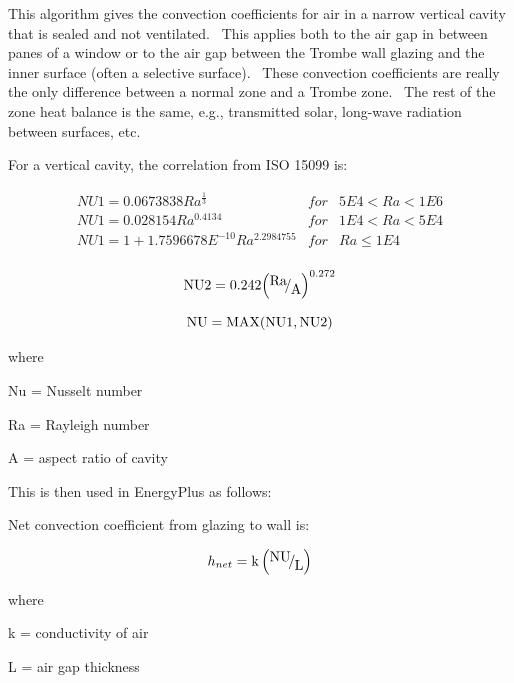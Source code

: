This algorithm gives the convection coefficients for air in a narrow vertical cavity that is sealed and not ventilated.~ This applies both to the air gap in between panes of a window or to the air gap between the Trombe wall glazing and the inner surface (often a selective surface).~ These convection coefficients are really the only difference between a normal zone and a Trombe zone.~ The rest of the zone heat balance is the same, e.g., transmitted solar, long-wave radiation between surfaces, etc.

For a vertical cavity, the correlation from ISO 15099 is:

\begin{equation}
\begin{array}{lcl}
    NU1 = 0.0673838 Ra^{\frac{1}{3}} & for &  5E4 < Ra < 1E6 \\
    NU1 = 0.028154 Ra^{0.4134} & for &  1E4 < Ra < 5E4 \\
    NU1 = 1 + 1.7596678E^{-10} Ra^{2.2984755} & for &  Ra \leq 1E4 \\
\end{array}
\end{equation}

\begin{equation}
{\rm{NU2}} = 0.242{\left( {{\raise0.7ex\hbox{{{\rm{Ra}}}} \!\mathord{\left/ {\vphantom {{{\rm{Ra}}} {\rm{A}}}}\right.}\!\lower0.7ex\hbox{{\rm{A}}}}} \right)^{0.272}}
\end{equation}

\begin{equation}
{\rm{NU = MAX(NU1,NU2)}}
\end{equation}

where

Nu = Nusselt number

Ra = Rayleigh number

A = aspect ratio of cavity

This is then used in EnergyPlus as follows:

Net convection coefficient from glazing to wall is:

\begin{equation}
{h_{net}} = {\rm{k}}\left( {{\raise0.7ex\hbox{{{\rm{NU}}}} \!\mathord{\left/ {\vphantom {{{\rm{NU}}} {\rm{L}}}}\right.}\!\lower0.7ex\hbox{{\rm{L}}}}} \right)
\end{equation}

where

k = conductivity of air

L = air gap thickness

